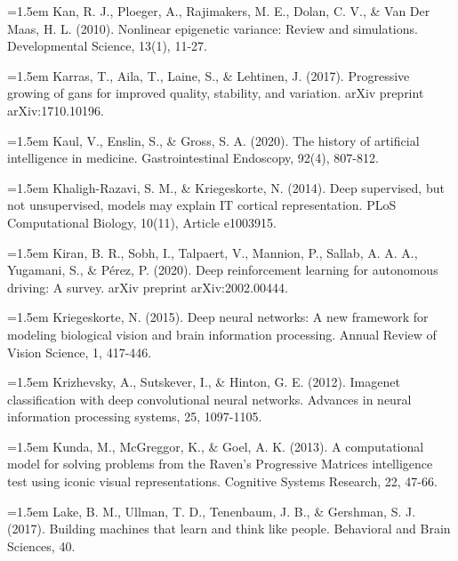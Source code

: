 \hangindent=1.5em
Kan, R. J., Ploeger, A., Rajimakers, M. E., Dolan, C. V.,
\& Van Der Maas, H. L. (2010).
Nonlinear epigenetic variance: Review and simulations.
Developmental Science, 13(1), 11-27.
\par

\hangindent=1.5em
Karras, T., Aila, T., Laine, S., \& Lehtinen, J. (2017).
Progressive growing of gans for improved quality, stability,
and variation.
arXiv preprint arXiv:1710.10196.
\par

\hangindent=1.5em
Kaul, V., Enslin, S., \& Gross, S. A. (2020).
The history of artificial intelligence in medicine.
Gastrointestinal Endoscopy, 92(4), 807-812.
\par

\hangindent=1.5em
Khaligh-Razavi, S. M., \& Kriegeskorte, N. (2014).
Deep supervised, but not unsupervised, models may explain
IT cortical representation.
PLoS Computational Biology, 10(11), Article e1003915.
\par

\hangindent=1.5em
Kiran, B. R., Sobh, I., Talpaert, V., Mannion, P.,
Sallab, A. A. A., Yugamani, S., \& Pérez, P. (2020).
Deep reinforcement learning for autonomous driving: A survey.
arXiv preprint arXiv:2002.00444.
\par

\hangindent=1.5em
Kriegeskorte, N. (2015).
Deep neural networks: A new framework for modeling biological
vision and brain information processing.
Annual Review of Vision Science, 1, 417-446.
\par

\hangindent=1.5em
Krizhevsky, A., Sutskever, I., \& Hinton, G. E. (2012).
Imagenet classification with deep convolutional neural networks.
Advances in neural information processing systems, 25, 1097-1105.
\par

\hangindent=1.5em
Kunda, M., McGreggor, K., \& Goel, A. K. (2013).
A computational model for solving problems from the Raven's
Progressive Matrices intelligence test using iconic visual
representations.
Cognitive Systems Research, 22, 47-66.
\par

\hangindent=1.5em
Lake, B. M., Ullman, T. D., Tenenbaum, J. B.,
\& Gershman, S. J. (2017).
Building machines that learn and think like people.
Behavioral and Brain Sciences, 40.
\par

